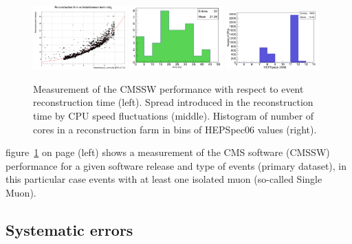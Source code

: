 \documentclass[a4paper]{jpconf}
\begin{document}
\begin{figure}[ht]
  \begin{center}
\includegraphics[width=0.32\textwidth,height=0.34\textwidth]{8.pdf}
\includegraphics[width=0.32\textwidth,height=0.34\textwidth]{9.pdf}
\includegraphics[width=0.32\textwidth,height=0.34\textwidth]{10.pdf}
\caption{\label{fig4} Measurement of the CMSSW performance with respect to event reconstruction time (left). Spread introduced in the reconstruction time by CPU speed fluctuations (middle). Histogram of number of cores in a reconstruction farm in bins of HEPSpec06 values (right).}
  \end{center}
\vspace{-6mm}
\end{figure}


figure~\ref{fig4} on page \pageref{fig4} (left) shows a measurement of the CMS software (CMSSW) performance for a given software release and type of events (primary dataset), in this particular case events with at least one isolated muon (so-called Single Muon). 


\subsection{Systematic errors}
\end{document}
